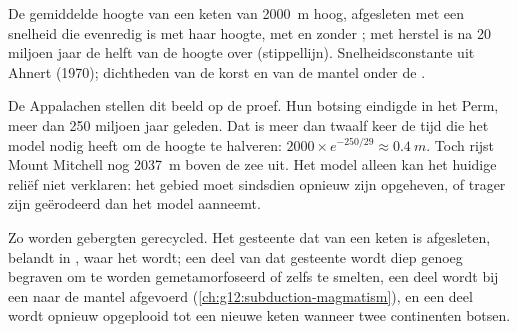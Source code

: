 \begin{omfigure}

{\small De gemiddelde hoogte van een keten van \qty{2000}{m} hoog, afgesleten met een snelheid
die evenredig is met haar hoogte, met en zonder ; met
herstel is na 20 miljoen jaar de helft van de hoogte over (stippellijn).
Snelheidsconstante uit Ahnert (1970); dichtheden van de korst en van de mantel onder
de .}
\end{omfigure}

De Appalachen stellen dit beeld op de proef. Hun botsing eindigde in het Perm,
meer dan 250 miljoen jaar geleden. Dat is meer dan twaalf keer de tijd die het
model nodig heeft om de hoogte te halveren: $2000 \times e^{-250/29} \approx
\qty{0.4}{m}$. Toch rijst Mount Mitchell nog \qty{2037}{m} boven de zee uit.
Het model alleen kan het huidige reliëf niet verklaren: het gebied moet sindsdien
opnieuw zijn opgeheven, of trager zijn geërodeerd dan het model aanneemt.

Zo worden gebergten gerecycled. Het gesteente dat van een keten is afgesleten, belandt in , waar het  wordt; een deel van dat gesteente wordt diep genoeg
begraven om te worden gemetamorfoseerd of zelfs te smelten, een deel wordt bij een 
naar de mantel afgevoerd (\cref{ch:g12:subduction-magmatism}), en een deel wordt
opnieuw opgeplooid tot een nieuwe keten wanneer twee continenten botsen.

